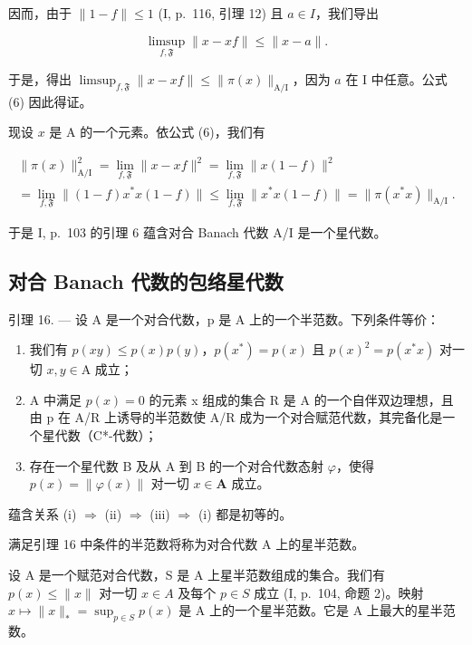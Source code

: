 因而，由于 \(\|1 - f\| \leqslant 1\) (I, p.~116, 引理 12) 且 \(a \in I\)，我们导出

\[
\operatorname * {l i m s u p} _ {f, \mathfrak {F}} \| x - x f \| \leqslant \| x - a \|.
\]

于是，得出 \(\limsup_{f,\mathfrak{F}} \|x - xf\| \leqslant \|\pi(x)\|_{\mathrm{A/I}}\)，因为 \(a\) 在 I 中任意。公式 (6) 因此得证。

现设 \(x\) 是 A 的一个元素。依公式 (6)，我们有

\[
\begin{array}{c} \| \pi (x) \| _ {\mathrm{A/I}} ^ {2} = \lim _ {f, \mathfrak {F}} \| x - x f \| ^ {2} = \lim _ {f, \mathfrak {F}} \| x (1 - f) \| ^ {2} \\ = \lim _ {f, \mathfrak {F}} \| (1 - f) x ^ {*} x (1 - f) \| \leqslant \lim _ {f, \mathfrak {F}} \| x ^ {*} x (1 - f) \| = \| \pi (x ^ {*} x) \| _ {\mathrm{A/I}}. \end{array}
\]

于是 I, p.~103 的引理 6 蕴含对合 Banach 代数 A/I 是一个星代数。

\subsection{对合 Banach 代数的包络星代数}

引理 16. --- 设 A 是一个对合代数，p 是 A 上的一个半范数。下列条件等价：

\begin{enumerate}
\def\labelenumi{(\roman{enumi})}
\item
  我们有 \(p(xy) \leqslant p(x)p(y)\)，\(p(x^{*}) = p(x)\) 且 \(p(x)^{2} = p(x^{*}x)\) 对一切 \(x, y \in \mathrm{A}\) 成立；
\item
  A 中满足 \(p(x) = 0\) 的元素 x 组成的集合 R 是 A 的一个自伴双边理想，且由 p 在 A/R 上诱导的半范数使 A/R 成为一个对合赋范代数，其完备化是一个星代数（C*-代数）；
\item
  存在一个星代数 B 及从 A 到 B 的一个对合代数态射 \(\varphi\)，使得 \(p(x) = \|\varphi(x)\|\) 对一切 \(x\in\mathbf{A}\) 成立。
\end{enumerate}

蕴含关系 (i) \(\Longrightarrow\) (ii) \(\Longrightarrow\) (iii) \(\Longrightarrow\) (i) 都是初等的。

满足引理 16 中条件的半范数将称为对合代数 A 上的星半范数。

设 A 是一个赋范对合代数，S 是 A 上星半范数组成的集合。我们有 \(p(x) \leqslant \|x\|\) 对一切 \(x \in A\) 及每个 \(p \in S\) 成立 (I, p.~104, 命题 2)。映射 \(x \mapsto \|x\|_* = \sup_{p \in S} p(x)\) 是 A 上的一个星半范数。它是 A 上最大的星半范数。

